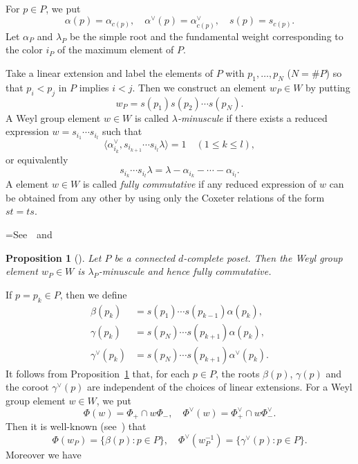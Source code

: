 \documentclass[10pt]{amsart}
\newtheorem{prop}[theo]{Proposition}
\theoremstyle{definition}
\theoremstyle{remark}
\begin{document}
For $p \in P$, we put
$$
\alpha(p) = \alpha_{c(p)},
\quad
\alpha^\vee(p) = \alpha^\vee_{c(p)},
\quad
s(p) = s_{c(p)}.
$$
Let $\alpha_P$ and $\lambda_P$ be the simple root and the fundamental weight 
corresponding to the color $i_P$ of the maximum element of $P$. 

Take a linear extension and label the elements of $P$ with $p_1, \ldots, p_N$ ($N= \# P$) 
so that $p_i < p_j$ in $P$ implies $i<j$.
Then we construct an element $w_P \in W$ by putting
$$
w_P = s(p_1) s(p_2) \cdots s(p_N).
$$
A Weyl group element $w \in W$ is called \emph{$\lambda$-minuscule} 
if there exists a reduced expression $w = s_{i_1} \cdots s_{i_l}$ such that
$$
\langle \alpha^\vee_{i_k}, s_{i_{k+1}} \cdots s_{i_l} \lambda \rangle = 1
\quad(1 \le k \le l),
$$
or equivalently
$$
s_{i_k} \cdots s_{i_l} \lambda = \lambda - \alpha_{i_k} - \cdots - \alpha_{i_l}.
$$
A element $w \in W$ is called \emph{fully commutative} 
if any reduced expression of $w$ can be obtained from any other by using only 
the Coxeter relations of the form $st = ts$.

\setbox\toto=\hbox{See~\cite{Proc2} and~\cite[Proposition~2.1]{Stem2}}
\begin{prop}[\box\toto]
\label{prop:w_P}
Let $P$ be a connected $d$-com\-plete poset.
Then the Weyl group element $w_P \in W$ is $\lambda_P$-minuscule and hence fully commutative.
\end{prop}

If $p = p_k \in P$, then we define 
\begin{align*}
\beta(p_k) &= s(p_1) \cdots s(p_{k-1}) \alpha(p_k),
\\
\gamma(p_k) &= s(p_N) \cdots s(p_{k+1}) \alpha(p_k),
\\
\gamma^\vee(p_k) &= s(p_N) \cdots s(p_{k+1}) \alpha^\vee(p_k).
\end{align*}
It follows from Proposition~\ref{prop:w_P} that, 
for each $p \in P$, the roots $\beta(p)$, $\gamma(p)$ and the coroot $\gamma^\vee(p)$ 
are independent of the choices of linear extensions.
For a Weyl group element $w \in W$, we put
$$
\Phi(w) = \Phi_+ \cap w \Phi_-,
\quad
\Phi^\vee(w) = \Phi^\vee_+ \cap w \Phi^\vee_-.
$$
Then it is well-known (see~\cite[\S~5.6]{H}) that
$$
\Phi(w_P) = \{ \beta(p) : p \in P \},
\quad
\Phi^\vee(w_P^{-1}) = \{ \gamma^\vee(p) : p \in P \}.
$$
Moreover we have
\end{document}
